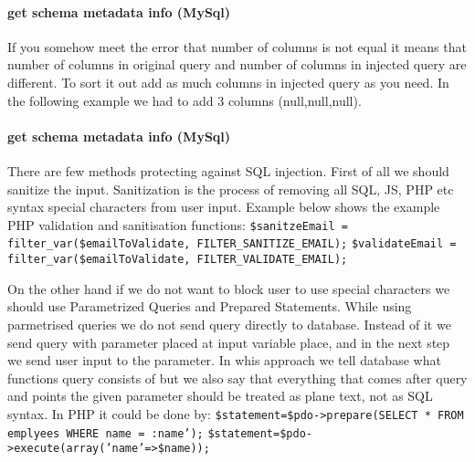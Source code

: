 \paragraph{get schema metadata info (MySql)} 
If you somehow meet the error that number of columns is not equal it means that number of columns in original query and number of columns in injected query are different.
To sort it out add as much columns in injected query as you need.
In the following example we had to add 3 columns (null,null,null).
\paragraph{get schema metadata info (MySql)} 

There are few methods protecting against SQL injection.
First of all we should sanitize the input.
Sanitization is the process of removing all SQL, JS, PHP etc syntax special characters from user input.
Example below shows the example PHP validation and sanitisation functions:
\newline
\newline
\texttt{\$sanitzeEmail = filter\_var(\$emailToValidate, FILTER\_SANITIZE\_EMAIL);}
\newline
\texttt{\$validateEmail = filter\_var(\$emailToValidate, FILTER\_VALIDATE\_EMAIL);}
\newline

On the other hand if we do not want to block user to use special characters we should use Parametrized Queries and Prepared Statements.
While using parmetrised queries we do not send query directly to database.
Instead of it we send query with parameter placed at input variable place, and in the next step we send user input to the parameter.
In whis approach we tell database what functions query consists of but we also say that everything that comes after query and points the given parameter should be treated as plane text, not as SQL syntax.
In PHP it could be done by:
\newline
\newline
\texttt{\$statement=\$pdo->prepare(SELECT * FROM emplyees WHERE name = :name');}
\newline
\texttt{\$statement=\$pdo->execute(array('name'=>\$name));}
\newline

